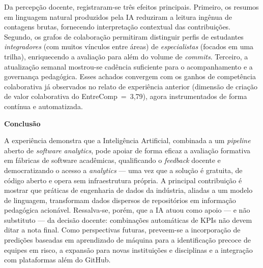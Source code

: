 \documentclass[12pt,a4paper]{article}
\newcommand{\secao}[1]{\medskip\noindent\textbf{#1}\par\nobreak\vspace{-0.1cm}}
\begin{document}
Da percepção docente, registraram-se três efeitos principais. Primeiro, os
resumos em linguagem natural produzidos pela IA reduziram a leitura ingênua de
contagens brutas, fornecendo interpretação contextual das contribuições.
Segundo, os grafos de colaboração permitiram distinguir perfis de estudantes
\textit{integradores} (com muitos vínculos entre áreas) de \textit{especialistas}
(focados em uma trilha), enriquecendo a avaliação para além do volume de
\textit{commits}. Terceiro, a atualização semanal mostrou-se cadência suficiente
para o acompanhamento e a governança pedagógica. Esses achados convergem com os
ganhos de competência colaborativa já observados no relato de experiência
anterior (dimensão de criação de valor colaborativa do EntreComp~=~3,79), agora
instrumentados de forma contínua e automatizada.

\secao{Conclusão}

A experiência demonstra que a Inteligência Artificial, combinada a um
\textit{pipeline} aberto de \textit{software analytics}, pode apoiar de forma
eficaz a avaliação formativa em fábricas de software acadêmicas, qualificando o
\textit{feedback} docente e democratizando o acesso a \textit{analytics} ---
uma vez que a solução é gratuita, de código aberto e opera sem infraestrutura
própria. A principal contribuição é mostrar que práticas de engenharia de dados
da indústria, aliadas a um modelo de linguagem, transformam dados dispersos de
repositórios em informação pedagógica acionável. Ressalva-se, porém, que a IA
atuou como apoio --- e não substituto --- da decisão docente: combinações
automáticas de KPIs não devem ditar a nota final. Como perspectivas futuras,
preveem-se a incorporação de predições baseadas em aprendizado de máquina para a
identificação precoce de equipes em risco, a expansão para novas instituições e
disciplinas e a integração com plataformas além do GitHub.

\begin{singlespace}
\small

\end{singlespace}
\end{document}
